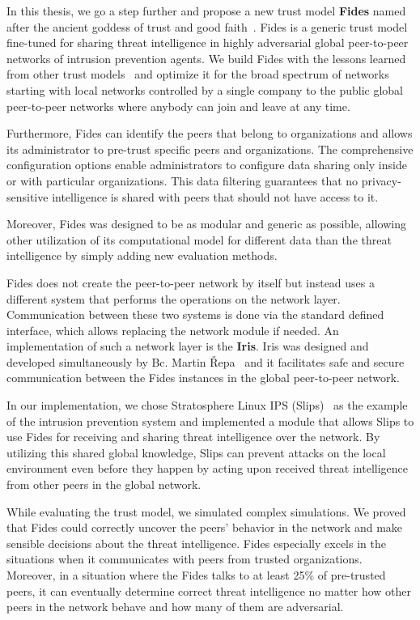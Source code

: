 In this thesis, we go a step further and propose a new trust model \textbf{Fides} named after the ancient goddess of trust and good faith~\cite{enwiki:1086924565}.
Fides is a generic trust model fine-tuned for sharing threat intelligence in highly adversarial global peer-to-peer networks of intrusion prevention agents.
We build Fides with the lessons learned from other trust models~\cite{sort, dita} and optimize it for the broad spectrum of networks starting with local networks controlled by a single company to the public global peer-to-peer networks where anybody can join and leave at any time.

Furthermore, Fides can identify the peers that belong to organizations and allows its administrator to pre-trust specific peers and organizations. The comprehensive configuration options enable administrators to configure data sharing only inside or with particular organizations. This data filtering guarantees that no privacy-sensitive intelligence is shared with peers that should not have access to it.

Moreover, Fides was designed to be as modular and generic as possible, allowing other utilization of its computational model for different data than the threat intelligence by simply adding new evaluation methods.

Fides does not create the peer-to-peer network by itself but instead uses a different system that performs the operations on the network layer.
Communication between these two systems is done via the standard defined interface, which allows replacing the network module if needed.
An implementation of such a network layer is the \textbf{Iris}. Iris was designed and developed simultaneously by Bc. Martin Řepa~\cite{nl} and it facilitates safe and secure communication between the Fides instances in the global peer-to-peer network.

In our implementation, we chose Stratosphere Linux IPS (Slips)~\cite{slips} as the example of the intrusion prevention system and implemented a module that allows Slips to use Fides for receiving and sharing threat intelligence over the network. 
By utilizing this shared global knowledge, Slips can prevent attacks on the local environment even before they happen by acting upon received threat intelligence from other peers in the global network.

While evaluating the trust model, we simulated complex simulations. We proved that Fides could correctly uncover the peers' behavior in the network and make sensible decisions about the threat intelligence. 
Fides especially excels in the situations when it communicates with peers from trusted organizations.
Moreover, in a situation where the Fides talks to at least 25\% of pre-trusted peers, it can eventually determine correct threat intelligence no matter how other peers in the network behave and how many of them are adversarial.

